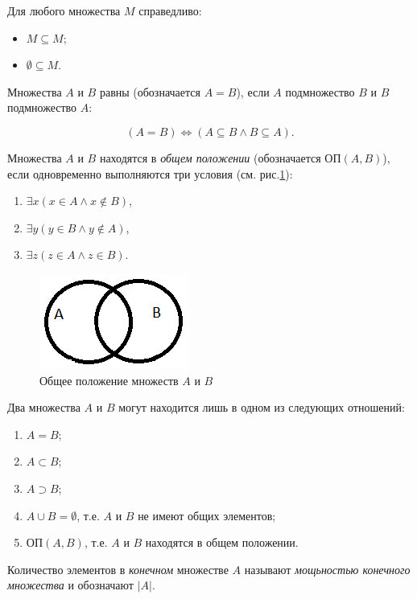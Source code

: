 Для любого множества $M$ справедливо:
\begin{itemize}
    \item $M\subseteq M$;
    \item $\emptyset\subseteq M$.
\end{itemize}

Множества $A$ и $B$ равны (обозначается $A=B$), если $A$ подмножество $B$ и $B$ подмножество $A$:

\begin{equation}
    \label{eq:ABSetEquality}
    (A=B)\Leftrightarrow(A\subseteq B\land B\subseteq A).
\end{equation}

Множества $A$ и $B$ находятся в \emph{общем положении} (обозначается $\text{ОП}(A,B)$), если одновременно выполняются три условия (см. рис.\ref{fig:commonABset}):
\begin{enumerate}
    \item $\exists x (x\in A \land  x\not\in B)$,
    \item $\exists y (y\in B \land  y\not\in A)$,
    \item $\exists z (z\in A \land  z\in B)$.
\end{enumerate}

\begin{figure}
    \centering
    \includegraphics{fig/commonABset}
    \caption{Общее положение множеств $A$ и $B$}
    \label{fig:commonABset}
\end{figure} 

Два множества $A$ и $B$ могут находится лишь в одном из следующих отношений:
\begin{enumerate}
    \item $A=B$;
    \item $A\subset B$;
    \item $A\supset B$;
    \item $A\cup B = \emptyset$, т.е. $A$ и $B$ не имеют общих элементов;
    \item $\text{ОП}(A,B)$, т.е. $A$ и $B$ находятся в общем положении. 
\end{enumerate}

Количество элементов в \emph{конечном} множестве $A$ называют \emph{мощьностью конечного множества} и обозначают $|A|$.


